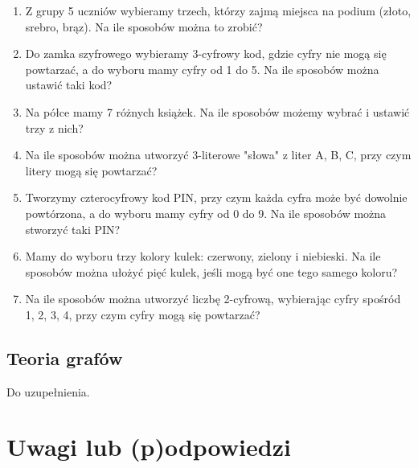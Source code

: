\documentclass[12pt]{article}
\begin{document}
\begin{enumerate}
	\item 
	Z grupy 5 uczniów wybieramy trzech, którzy zajmą miejsca na podium (złoto, srebro, brąz). Na ile sposobów można to zrobić?
	\item 
	Do zamka szyfrowego wybieramy 3-cyfrowy kod, gdzie cyfry nie mogą się powtarzać, a do wyboru mamy cyfry od 1 do 5. Na ile sposobów można ustawić taki kod?
	\item 
	Na półce mamy 7 różnych książek. Na ile sposobów możemy wybrać i ustawić trzy z nich?
	\item 
	Na ile sposobów można utworzyć 3-literowe "słowa" z liter A, B, C, przy czym litery mogą się powtarzać?
	\item 
	Tworzymy czterocyfrowy kod PIN, przy czym każda cyfra może być dowolnie powtórzona, a do wyboru mamy cyfry od 0 do 9. Na ile sposobów można stworzyć taki PIN?
	\item 
	Mamy do wyboru trzy kolory kulek: czerwony, zielony i niebieski. Na ile sposobów można ułożyć pięć kulek, jeśli mogą być one tego samego koloru?
	\item 
	Na ile sposobów można utworzyć liczbę 2-cyfrową, wybierając cyfry spośród 1, 2, 3, 4, przy czym cyfry mogą się powtarzać?
\end{enumerate} 

\subsection{Teoria grafów}
Do uzupełnienia.

\section{Uwagi lub (p)odpowiedzi}
\end{document}
